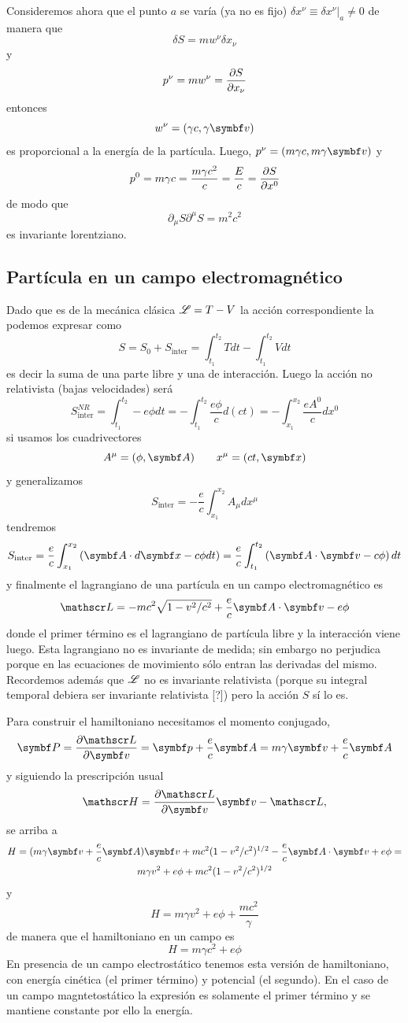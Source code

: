 \documentclass[10pt,oneside]{CBFT_book}
\begin{document}
Consideremos ahora que el punto $a$ se varía (ya no es fijo) $ \delta x^\nu \equiv \delta x^\nu |_a \neq 0 $
de manera que 
\[
	\delta S = m w^\nu \delta x_\nu
\]
y
\[
	p^\nu = m w^\nu = \frac{\partial^{\hspace{-0.05em}} {S}}{\partial {x_\nu}^{\hspace{-0.05em}}}
\]
entonces
\[
	w^\nu = (\gamma c, \gamma \vb{v})
\]
es proporcional a la energía de la partícula. Luego, $p^\nu = ( m \gamma c, m \gamma \vb{v})$ y
\[
	p^0 = m \gamma c = \frac{ m \gamma c^2 }{c} = \frac{E}{c} = \frac{\partial^{\hspace{-0.05em}} {S}}{\partial {x^0}^{\hspace{-0.05em}}}
\]
de modo que
\[
	\partial_\mu  S \partial^\mu S = m^2c^2
\]
es invariante lorentziano.

\subsection{Partícula en un campo electromagnético}

Dado que es de la mecánica clásica $\mathscr{L} = T - V$ la acción correspondiente la podemos expresar  como 
\[
	S = S_0 + S_{\text{inter}} = \int_{t_1}^{t_2} T dt - \int_{t_1}^{t_2} V dt
\]
es decir la suma de una parte libre y una de interacción. Luego la acción no relativista (bajas
velocidades) será
\[
	S_{\text{inter}}^{NR} = \int_{t_1}^{t_2} -e \phi dt =  -\int_{t_1}^{t_2} \frac{ e \phi }{c} d(ct) = 
		-\int_{x_1}^{x_2} \frac{ e A^0 }{c} dx^0
\]
si usamos los cuadrivectores 
\[
	A^\mu = ( \phi, \vb{A} ) \qquad x^\mu = ( ct, \vb{x} ) 
\]
y generalizamos 
\[
	S_{\text{inter}} = - \frac{e}{c} \int_{x_1}^{x_2} A_\mu dx^\mu
\]
tendremos 
\[
	S_{\text{inter}} = \frac{e}{c} \int_{x_1}^{x_2} \left( \vb{A}\cdot d\vb{x} - c \phi dt \right) = 
	\frac{e}{c} \int_{t_1}^{t_2} \left( \vb{A}\cdot\vb{v} - c \phi \right) dt
\]
y finalmente el lagrangiano de una partícula en un campo electromagnético es 
\[
	\Lag = - m c^2 \sqrt{ 1 - v^2/c^2 } + \frac{e}{c} \pe{A}{v} - e \phi
\]
donde el primer término es el lagrangiano de partícula libre y la interacción viene luego. Esta lagrangiano 
no es invariante de medida; sin embargo no perjudica porque en las ecuaciones de movimiento sólo entran las
derivadas del mismo. Recordemos además que $\mathscr{L}$ no es invariante relativista (porque su integral temporal
debiera ser invariante relativista [?]) pero la acción $S$ sí lo es.

Para construir el hamiltoniano necesitamos el momento conjugado,
\[
	\vb{P} = \dpar{\Lag}{\vb{v}} = \vb{p} + \frac{e}{c}\vb{A} = m\gamma \vb{v} + \frac{e}{c}\vb{A}
\]
y siguiendo la prescripción usual 
\[ 
	\Ham = \dpar{\Lag}{\vb{v}}\vb{v} - \Lag,
\]
se arriba a
\begin{multline*}
	H = ( m\gamma \vb{v} + \frac{e}{c}\vb{A} )\vb{v} + mc^2(1-v^2/c^2)^{1/2} -
		\frac{e}{c}\pe{A}{v} + e\phi = \\
		m\gamma v^2 + e\phi + mc^2(1 - v^2/c^2)^{1/2}
\end{multline*}
y 
\[
	H =  m \gamma v^2 + e\phi + \frac{m c^2}{\gamma}  
\]
de manera que el hamiltoniano en un campo es 
\[
	H = m \gamma c^2 + e \phi
\]
En presencia de un campo electrostático tenemos esta versión de hamiltoniano, con energía
cinética (el primer término) y potencial (el segundo). En el caso de un campo 
magntetostático la expresión es solamente el primer término y se mantiene constante por
ello la energía.
\end{document}
